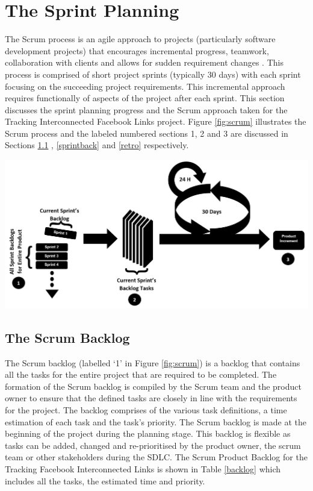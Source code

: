 \documentclass[12pt,onecolumn]{article}
\begin{document}
	\section{The Sprint Planning}
	The Scrum process is an agile approach to projects (particularly software development projects) that encourages incremental progress, teamwork, collaboration with clients and allows for sudden requirement changes \cite{Cohn}. This process is comprised of short project sprints (typically 30 days) with each sprint focusing on the succeeding project requirements. This incremental approach requires functionally of aspects of the project after each sprint. This section discusses the sprint planning progress and the Scrum approach taken for the Tracking Interconnected Facebook Links project. Figure \ref{fig:scrum} illustrates the Scrum process and the labeled numbered sections 1, 2 and 3 are discussed in Sections  \ref{scrumback} ,  \ref{sprintback} and  \ref{retro} respectively.
	
\begin{center}
	\includegraphics[width=\textwidth]{scrum}
	 \label{fig:scrum}
\end{center}
		
		

	\subsection{The Scrum Backlog } \label{scrumback}
	The Scrum backlog (labelled `1' in Figure \ref{fig:scrum}) is a backlog that contains all the tasks for the entire project that are required to be completed. The formation of the Scrum backlog is compiled by the Scrum team and the product owner to ensure that the defined tasks are closely in line with the requirements for the project. The backlog comprises of the various task definitions, a time estimation of each task and the task's priority. The Scrum backlog is made at the beginning of the project during the planning stage. This backlog is flexible as tasks can be added, changed and re-prioritised by the product owner, the scrum team or other stakeholders during the SDLC. The Scrum Product Backlog for the Tracking Facebook Interconnected Links is shown in Table \ref{backlog} which includes all the tasks, the estimated time and priority.     
	
\end{document}
